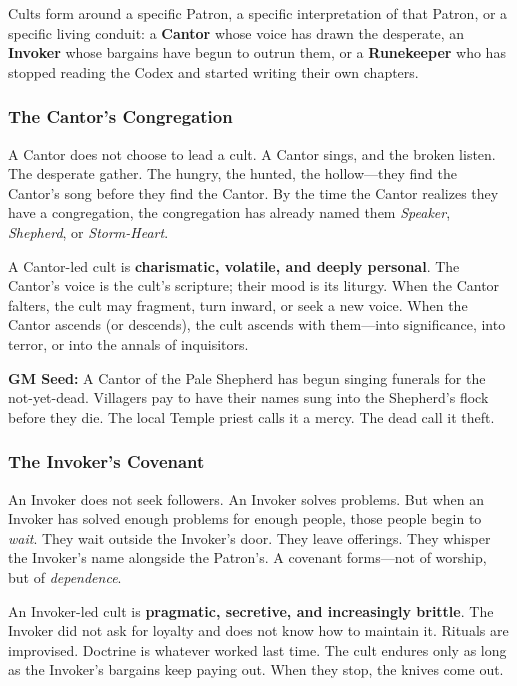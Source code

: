 Cults form around a specific Patron, a specific interpretation of that Patron, or a specific living conduit: a \textbf{Cantor} whose voice has drawn the desperate, an \textbf{Invoker} whose bargains have begun to outrun them, or a \textbf{Runekeeper} who has stopped reading the Codex and started writing their own chapters.

\subsubsection*{The Cantor's Congregation}

A Cantor does not choose to lead a cult. A Cantor sings, and the broken listen. The desperate gather. The hungry, the hunted, the hollow---they find the Cantor's song before they find the Cantor. By the time the Cantor realizes they have a congregation, the congregation has already named them \textit{Speaker}, \textit{Shepherd}, or \textit{Storm-Heart}.

A Cantor-led cult is \textbf{charismatic, volatile, and deeply personal}. The Cantor's voice is the cult's scripture; their mood is its liturgy. When the Cantor falters, the cult may fragment, turn inward, or seek a new voice. When the Cantor ascends (or descends), the cult ascends with them---into significance, into terror, or into the annals of inquisitors.

\textbf{GM Seed:} A Cantor of the Pale Shepherd has begun singing funerals for the not-yet-dead. Villagers pay to have their names sung into the Shepherd's flock before they die. The local Temple priest calls it a mercy. The dead call it theft.

\subsubsection*{The Invoker's Covenant}

An Invoker does not seek followers. An Invoker solves problems. But when an Invoker has solved enough problems for enough people, those people begin to \textit{wait}. They wait outside the Invoker's door. They leave offerings. They whisper the Invoker's name alongside the Patron's. A covenant forms---not of worship, but of \textit{dependence}.

An Invoker-led cult is \textbf{pragmatic, secretive, and increasingly brittle}. The Invoker did not ask for loyalty and does not know how to maintain it. Rituals are improvised. Doctrine is whatever worked last time. The cult endures only as long as the Invoker's bargains keep paying out. When they stop, the knives come out.

